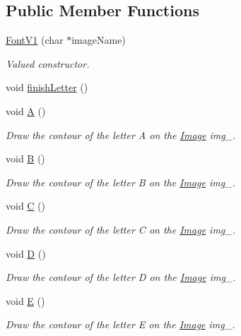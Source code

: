 \subsection*{Public Member Functions}
\begin{DoxyCompactItemize}
\item 
\mbox{\hyperlink{class_font_v1_ada1ed699d42679f81146af4bc20db006}{Font\+V1}} (char $\ast$image\+Name)
\begin{DoxyCompactList}\small\item\em Valued constructor. \end{DoxyCompactList}\item 
void \mbox{\hyperlink{class_font_v1_a29e1b96b06056aad8542c3d2ac79ebf2}{finish\+Letter}} ()
\item 
void \mbox{\hyperlink{class_font_v1_a29afd2079bc41cdec9d3de6bb4e1be52}{A}} ()
\begin{DoxyCompactList}\small\item\em Draw the contour of the letter A on the \mbox{\hyperlink{class_image}{Image}} img\+\_\+. \end{DoxyCompactList}\item 
void \mbox{\hyperlink{class_font_v1_a620ee7876d479807f73481f27be48f2a}{B}} ()
\begin{DoxyCompactList}\small\item\em Draw the contour of the letter B on the \mbox{\hyperlink{class_image}{Image}} img\+\_\+. \end{DoxyCompactList}\item 
void \mbox{\hyperlink{class_font_v1_a80602716ae6907fa518fbb50eeda2515}{C}} ()
\begin{DoxyCompactList}\small\item\em Draw the contour of the letter C on the \mbox{\hyperlink{class_image}{Image}} img\+\_\+. \end{DoxyCompactList}\item 
void \mbox{\hyperlink{class_font_v1_a3f4558aabfef6e0783c2294aecf215d0}{D}} ()
\begin{DoxyCompactList}\small\item\em Draw the contour of the letter D on the \mbox{\hyperlink{class_image}{Image}} img\+\_\+. \end{DoxyCompactList}\item 
void \mbox{\hyperlink{class_font_v1_ab8a34299af7a36cfd94c2691b579a0fa}{E}} ()
\begin{DoxyCompactList}\small\item\em Draw the contour of the letter E on the \mbox{\hyperlink{class_image}{Image}} img\+\_\+. \end{DoxyCompactList}\item 

\end{DoxyCompactItemize}
